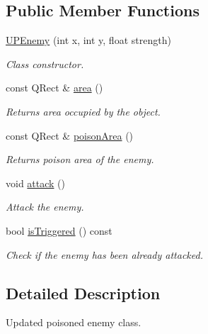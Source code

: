 \subsection*{Public Member Functions}
\begin{DoxyCompactItemize}
\item 
\hyperlink{classUPEnemy_a118be97fa267047357fb56571eaef1ed}{U\+P\+Enemy} (int x, int y, float strength)
\begin{DoxyCompactList}\small\item\em Class constructor. \end{DoxyCompactList}\item 
const Q\+Rect \& \hyperlink{classUPEnemy_aa87ac038b30dccbad0a0966824d99382}{area} ()\hypertarget{classUPEnemy_aa87ac038b30dccbad0a0966824d99382}{}\label{classUPEnemy_aa87ac038b30dccbad0a0966824d99382}

\begin{DoxyCompactList}\small\item\em Returns area occupied by the object. \end{DoxyCompactList}\item 
const Q\+Rect \& \hyperlink{classUPEnemy_a88cc91ecae7705053e6cfbab57f60503}{poison\+Area} ()\hypertarget{classUPEnemy_a88cc91ecae7705053e6cfbab57f60503}{}\label{classUPEnemy_a88cc91ecae7705053e6cfbab57f60503}

\begin{DoxyCompactList}\small\item\em Returns poison area of the enemy. \end{DoxyCompactList}\item 
void \hyperlink{classUPEnemy_aa1145894e8e7c203796e653309fdb661}{attack} ()
\begin{DoxyCompactList}\small\item\em Attack the enemy. \end{DoxyCompactList}\item 
bool \hyperlink{classUPEnemy_a4a3e30df0c5f369a4859803970d5e69c}{is\+Triggered} () const \hypertarget{classUPEnemy_a4a3e30df0c5f369a4859803970d5e69c}{}\label{classUPEnemy_a4a3e30df0c5f369a4859803970d5e69c}

\begin{DoxyCompactList}\small\item\em Check if the enemy has been already attacked. \end{DoxyCompactList}\end{DoxyCompactItemize}


\subsection{Detailed Description}
Updated poisoned enemy class. 


